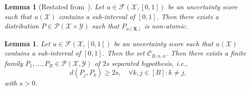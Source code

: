 \documentclass{article}
\theoremstyle{plain}
\newtheorem{lemma}[theorem]{Lemma}
\theoremstyle{definition}
\theoremstyle{remark}
\begin{document}
\begin{lemma}[Restated from~\cite{gupta2022distributionfreebinaryclassificationprediction}]
    Let $u \in \mathcal{F}(\mathcal{X}, [0,1])$ be an uncertainty score such that $u(\mathcal{X})$ contains a sub-interval of $[0,1]$. Then there exists a distribution $P \in  \mathcal{P}(\mathcal{X} \times \mathcal{Y})$ such that $P_{u(\mathbf{X})}$ is non-atomic.
\end{lemma}

\begin{lemma}
     Let $u \in \mathcal{F}(\mathcal{X}, [0,1])$ be an uncertainty score such that $u(\mathcal{X})$ contains a sub-interval of $[0,1]$. Then the set $\mathcal{C}_{B,n, \alpha}$. Then there exists a finite family $P_1, \dots, P_B \in \mathcal{P}(\mathcal{X}, \mathcal{Y})$ of $2$s separated hypothesis, \textit{i.e.},
\begin{equation}
    \label{eq:2s_separated}
     d(P_j, P_k) \geq 2 s, \quad \forall k, j \in [B]: k \neq j,
\end{equation}
with $s > 0$.
\end{lemma}
\end{document}
